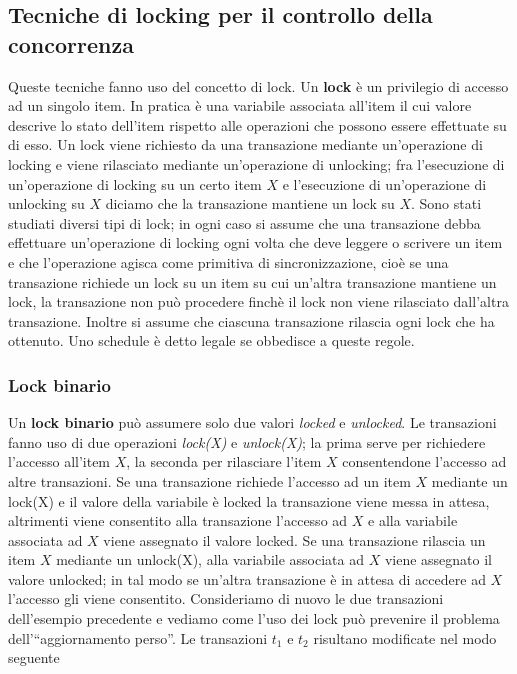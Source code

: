 \subsection{Tecniche di locking per il controllo della concorrenza}
Queste tecniche fanno uso del concetto di lock. Un \textbf{lock} è un privilegio di accesso ad un singolo
item. In pratica è una variabile associata all’item il cui valore descrive lo stato dell’item rispetto alle
operazioni che possono essere effettuate su di esso. Un lock viene richiesto da una transazione
mediante un’operazione di locking e viene rilasciato mediante un’operazione di unlocking; fra
l’esecuzione di un’operazione di locking su un certo item $X$ e l’esecuzione di un’operazione di
unlocking su $X$ diciamo che la transazione mantiene un lock su $X$. Sono stati studiati diversi tipi di
lock; in ogni caso si assume che una transazione debba effettuare un’operazione di locking ogni
volta che deve leggere o scrivere un item e che l’operazione agisca come primitiva di
sincronizzazione, cioè se una transazione richiede un lock su un item su cui un’altra transazione
mantiene un lock, la transazione non può procedere finchè il lock non viene rilasciato dall’altra
transazione. Inoltre si assume che ciascuna transazione rilascia ogni lock che ha ottenuto. Uno
schedule è detto legale se obbedisce a queste regole.

\subsubsection{Lock binario}
Un \textbf{lock binario} può assumere solo due valori \emph{locked} e \emph{unlocked}. Le transazioni 
fanno uso di due operazioni \emph{lock(X)} e \emph{unlock(X)}; la prima serve per richiedere l’accesso
all’item $X$, la seconda per rilasciare l’item $X$ consentendone l’accesso ad altre transazioni. Se una 
transazione richiede l’accesso ad un item $X$ mediante un lock(X) e il valore della variabile è locked 
la transazione viene messa in attesa, altrimenti viene consentito alla transazione l’accesso ad $X$ e 
alla variabile associata ad $X$ viene assegnato il valore locked. 
Se una transazione rilascia un item $X$ mediante un unlock(X), alla variabile associata ad $X$ 
viene assegnato il valore unlocked; in tal modo se un’altra transazione è in attesa di accedere ad $X$ 
l’accesso gli viene consentito. Consideriamo di nuovo le due transazioni dell’esempio precedente e 
vediamo come l’uso dei lock può prevenire il problema dell’``aggiornamento perso''. 
Le transazioni $t_1$ e $t_2$ risultano modificate nel modo seguente 

